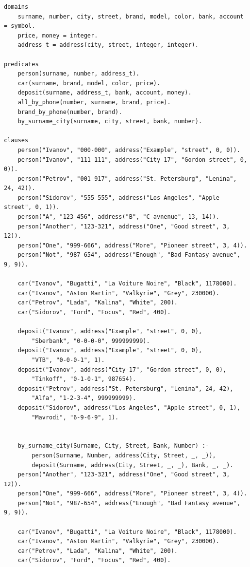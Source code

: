 \documentclass[a4paper, 12pt]{article}
\begin{document}
\begin{lstlisting}
domains
	surname, number, city, street, brand, model, color, bank, account = symbol.
	price, money = integer.
	address_t = address(city, street, integer, integer).

predicates
	person(surname, number, address_t).
	car(surname, brand, model, color, price).
	deposit(surname, address_t, bank, account, money).
	all_by_phone(number, surname, brand, price).
	brand_by_phone(number, brand).
	by_surname_city(surname, city, street, bank, number).

clauses
	person("Ivanov", "000-000", address("Example", "street", 0, 0)).
	person("Ivanov", "111-111", address("City-17", "Gordon street", 0, 0)).
	person("Petrov", "001-917", address("St. Petersburg", "Lenina", 24, 42)).
	person("Sidorov", "555-555", address("Los Angeles", "Apple street", 0, 1)).
	person("A", "123-456", address("B", "C avnenue", 13, 14)).
	person("Another", "123-321", address("One", "Good street", 3, 12)).
	person("One", "999-666", address("More", "Pioneer street", 3, 4)).
	person("Not", "987-654", address("Enough", "Bad Fantasy avenue", 9, 9)).

	car("Ivanov", "Bugatti", "La Voiture Noire", "Black", 1178000).
	car("Ivanov", "Aston Martin", "Valkyrie", "Grey", 230000).
	car("Petrov", "Lada", "Kalina", "White", 200).
	car("Sidorov", "Ford", "Focus", "Red", 400).

	deposit("Ivanov", address("Example", "street", 0, 0), 
		"Sberbank", "0-0-0-0", 999999999).
	deposit("Ivanov", address("Example", "street", 0, 0), 
		"VTB", "0-0-0-1", 1).
	deposit("Ivanov", address("City-17", "Gordon street", 0, 0), 
		"Tinkoff", "0-1-0-1", 987654).
	deposit("Petrov", address("St. Petersburg", "Lenina", 24, 42), 
		"Alfa", "1-2-3-4", 999999999).
	deposit("Sidorov", address("Los Angeles", "Apple street", 0, 1), 
		"Mavrodi", "6-9-6-9", 1).


	by_surname_city(Surname, City, Street, Bank, Number) :- 
		person(Surname, Number, address(City, Street, _, _)), 
		deposit(Surname, address(City, Street, _, _), Bank, _, _).
	person("Another", "123-321", address("One", "Good street", 3, 12)).
	person("One", "999-666", address("More", "Pioneer street", 3, 4)).
	person("Not", "987-654", address("Enough", "Bad Fantasy avenue", 9, 9)).

	car("Ivanov", "Bugatti", "La Voiture Noire", "Black", 1178000).
	car("Ivanov", "Aston Martin", "Valkyrie", "Grey", 230000).
	car("Petrov", "Lada", "Kalina", "White", 200).
	car("Sidorov", "Ford", "Focus", "Red", 400).


\end{lstlisting}
\end{document}
